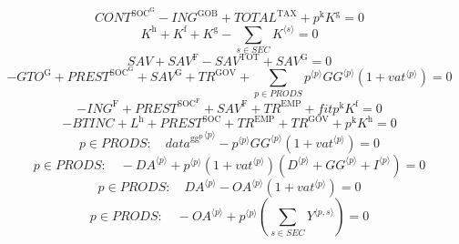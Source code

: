 \begin{equation}
{C\!O\!N\!T}^{\mathrm{SOC}^{\mathrm{G}}} - {I\!N\!G}^{\mathrm{GOB}} + {T\!O\!T\!A\!L}^{\mathrm{TAX}} + {p^{\mathrm{k}}} {K^{\mathrm{g}}} = 0
\end{equation}
\begin{equation}
K^{\mathrm{h}} + K^{\mathrm{f}} + K^{\mathrm{g}} - \sum_{s\in {S\!E\!C}} {K}^{\langle s\rangle} = 0
\end{equation}
\begin{equation}
{S\!A\!V} + {S\!A\!V}^{\mathrm{F}} - {S\!A\!V}^{\mathrm{TOT}} + {S\!A\!V}^{\mathrm{G}} = 0
\end{equation}
\begin{equation}
-{G\!T\!O}^{\mathrm{G}} + {P\!R\!E\!S\!T}^{\mathrm{SOC}^{\mathrm{G}}} + {S\!A\!V}^{\mathrm{G}} + {T\!R}^{\mathrm{GOV}} + \sum_{p\in {P\!R\!O\!D\!S}} {{p}^{\langle p\rangle}} {{{G\!G}}^{\langle p\rangle}} \left(1 + {{v\!a\!t}}^{\langle p\rangle}\right) = 0
\end{equation}
\begin{equation}
-{I\!N\!G}^{\mathrm{F}} + {P\!R\!E\!S\!T}^{\mathrm{SOC}^{\mathrm{F}}} + {S\!A\!V}^{\mathrm{F}} + {T\!R}^{\mathrm{EMP}} + {{f\!i\!t}} {p^{\mathrm{k}}} {K^{\mathrm{f}}} = 0
\end{equation}
\begin{equation}
-{B\!T\!I\!N\!C} + L^{\mathrm{h}} + {P\!R\!E\!S\!T}^{\mathrm{SOC}} + {T\!R}^{\mathrm{EMP}} + {T\!R}^{\mathrm{GOV}} + {p^{\mathrm{k}}} {K^{\mathrm{h}}} = 0
\end{equation}
\begin{equation}
p\in {P\!R\!O\!D\!S}\colon\quad {{d\!a\!t\!a}^{\mathrm{gg}^{\mathrm{p}}}}^{\langle p\rangle} - {{p}^{\langle p\rangle}} {{{G\!G}}^{\langle p\rangle}} \left(1 + {{v\!a\!t}}^{\langle p\rangle}\right) = 0
\end{equation}
\begin{equation}
p\in {P\!R\!O\!D\!S}\colon\quad -{{D\!A}}^{\langle p\rangle} + {{p}^{\langle p\rangle}} \left(1 + {{v\!a\!t}}^{\langle p\rangle}\right) \left({D}^{\langle p\rangle} + {{G\!G}}^{\langle p\rangle} + {I}^{\langle p\rangle}\right) = 0
\end{equation}
\begin{equation}
p\in {P\!R\!O\!D\!S}\colon\quad {{D\!A}}^{\langle p\rangle} - {{{O\!A}}^{\langle p\rangle}} \left(1 + {{v\!a\!t}}^{\langle p\rangle}\right) = 0
\end{equation}
\begin{equation}
p\in {P\!R\!O\!D\!S}\colon\quad -{{O\!A}}^{\langle p\rangle} + {{p}^{\langle p\rangle}} \left(\sum_{s\in {S\!E\!C}} {Y}^{\langle p,s\rangle}\right) = 0
\end{equation}
